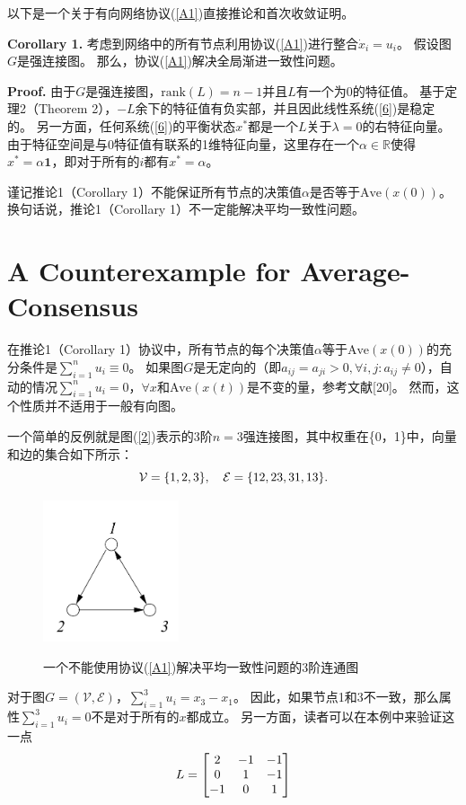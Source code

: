\documentclass{article}
\begin{document}
以下是一个关于有向网络协议(\ref{A1})直接推论和首次收敛证明。

\noindent \textbf{Corollary 1.} 考虑到网络中的所有节点利用协议(\ref{A1})进行整合$\dot{x}_i = u_i$。
假设图$G$是强连接图。
那么，协议(\ref{A1})解决全局渐进一致性问题。

\noindent \textbf{Proof.} 由于$G$是强连接图，$\text{rank}(L)=n-1$并且$L$有一个为0的特征值。
基于定理2（Theorem 2），$-L$余下的特征值有负实部，并且因此线性系统(\ref{6})是稳定的。
另一方面，任何系统(\ref{6})的平衡状态$x^*$都是一个$L$关于$\lambda=0$的右特征向量。
由于特征空间是与0特征值有联系的1维特征向量，这里存在一个$\alpha\in \mathbb{R}$使得$x^*=\alpha\mathbf{1}$，即对于所有的$i$都有$x^*=\alpha$。

谨记推论1（Corollary 1）不能保证所有节点的决策值$\alpha$是否等于$\text{Ave}(x(0))$。
换句话说，推论1（Corollary 1）不一定能解决平均一致性问题。


\section{A Counterexample for Average-Consensus}
在推论1（Corollary 1）协议中，所有节点的每个决策值$\alpha$等于$\text{Ave}(x(0))$的充分条件是$\sum_{i=1}^{n}u_i \equiv 0$。
如果图$G$是无定向的（即$a_{ij}=a_{ji} > 0,\forall i,j: a_{ij}\ne 0$），自动的情况$\sum_{i=1}^{n}u_i=0$，$\forall x$和$\text{Ave}(x(t))$是不变的量，参考文献[20]。
然而，这个性质并不适用于一般有向图。

一个简单的反例就是图(\ref{2})表示的3阶$n=3$强连接图，其中权重在\{0，1\}中，向量和边的集合如下所示：
\begin{equation}
    \mathcal{V} = \{1, 2, 3 \},\quad \mathcal{E}=\{12, 23, 31, 13\}.
    \notag
\end{equation}
\begin{figure}[htbp]
    \centering
    \includegraphics[width=4cm]{figures/Fig2-ConnectedDigraph.jpeg}
    \label{ConnectedDigraph}
    \caption{一个不能使用协议(\ref{A1})解决平均一致性问题的3阶连通图}
\end{figure}

对于图$G=(\mathcal{V}, \mathcal{E})$，$\sum_{i=1}^{3}u_i = x_3 - x_1$。
因此，如果节点1和3不一致，那么属性$\sum_{i=1}^{3}u_i = 0$不是对于所有的$x$都成立。
另一方面，读者可以在本例中来验证这一点
\begin{equation}
    L = \left[
    \begin{matrix}
        2 & -1 & -1 \\
        0 & 1 & -1 \\
        -1 & 0 & 1 
    \end{matrix}
    \right]
    \notag
\end{equation}
\end{document}
